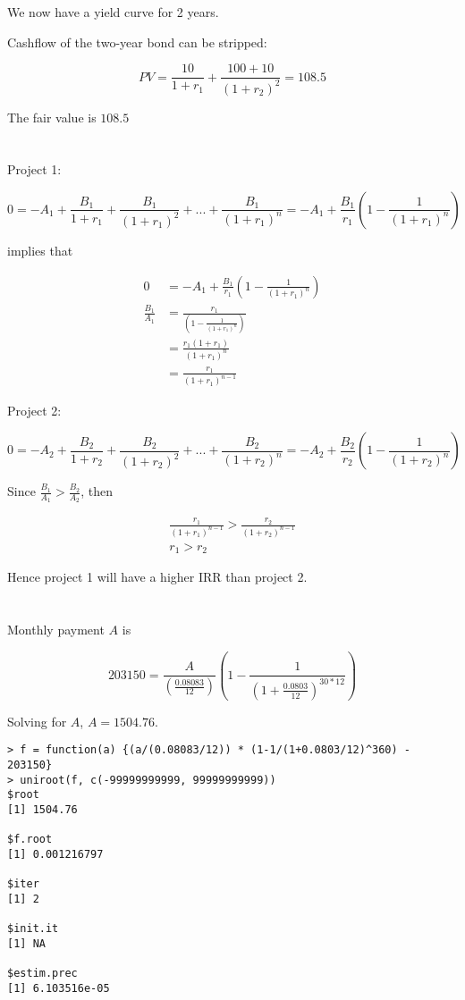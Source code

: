 \documentclass[11pt]{scrartcl}
\begin{document}
We now have a yield curve for 2 years.

Cashflow of the two-year bond can be stripped:

\[PV = \frac{10}{1+r_1} + \frac{100 + 10}{(1+r_2)^2} = 108.5\]

The fair value is $108.5$

\section{}

Project 1:

\[0 = -A_1 + \frac{B_1}{1+r_1} + \frac{B_1}{(1+r_1)^2} + ... + \frac{B_1}{(1+r_1)^n} = -A_1 + \frac{B_1}{r_1} \left(1-\frac{1}{(1+r_1)^n}\right)\]

implies that

\begin{align*}
0 &= -A_1 + \frac{B_1}{r_1} \left(1-\frac{1}{(1+r_1)^n} \right)\\
\frac{B_1}{A_1} &= \frac{r_1}{\left(1-\frac{1}{(1+r_1)^n} \right)} \\
&= \frac{r_1 (1+r_1)}{(1+r_1)^n} \\
&= \frac{r_1}{(1+r_1)^{n-1}}
\end{align*}

Project 2:

\[0 = -A_2 + \frac{B_2}{1+r_2} + \frac{B_2}{(1+r_2)^2} + ... + \frac{B_2}{(1+r_2)^n} = -A_2 + \frac{B_2}{r_2} \left(1-\frac{1}{(1+r_2)^n}\right)\]

Since $\frac{B_1}{A_1} > \frac{B_2}{A_2}$, then

\begin{align*}
\frac{r_1}{(1+r_1)^{n-1}} > \frac{r_2}{(1+r_2)^{n-1}}\\
r_1 > r_2
\end{align*}

Hence project 1 will have a higher IRR than project 2.

\section{}

Monthly payment $A$ is

\[203150 = \frac{A}{\left( \frac{0.08083}{12} \right)} \left(1 - \frac{1}{\left(1+\frac{0.0803}{12}\right)^{30*12}} \right)\]

Solving for $A$, $A = 1504.76$.

\begin{lstlisting}
> f = function(a) {(a/(0.08083/12)) * (1-1/(1+0.0803/12)^360) - 203150}
> uniroot(f, c(-99999999999, 99999999999))
$root
[1] 1504.76

$f.root
[1] 0.001216797

$iter
[1] 2

$init.it
[1] NA

$estim.prec
[1] 6.103516e-05
\end{lstlisting}
\end{document}
